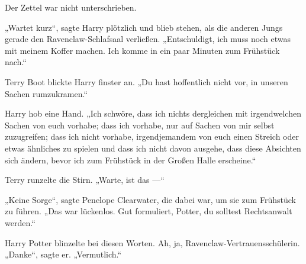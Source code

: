 \begin{writtenNote}
\end{writtenNote}

Der Zettel war nicht unterschrieben.

\later

„Wartet kurz“, sagte Harry plötzlich und blieb stehen, als die anderen Jungs gerade den Ravenclaw-Schlafsaal verließen.
„Entschuldigt, ich muss noch etwas mit meinem Koffer machen. Ich komme in ein paar Minuten zum Frühstück nach.“

Terry Boot blickte Harry finster an.
„Du hast hoffentlich nicht vor, in unseren Sachen rumzukramen.“

Harry hob eine Hand.
„Ich schwöre, dass ich nichts dergleichen mit irgendwelchen Sachen von euch vorhabe; dass ich vorhabe, nur auf Sachen von mir selbst zuzugreifen; dass ich nicht vorhabe, irgendjemandem von euch einen Streich oder etwas ähnliches zu spielen und dass ich nicht davon ausgehe, dass diese Absichten sich ändern, bevor ich zum Frühstück in der Großen Halle erscheine.“

Terry runzelte die Stirn.
„Warte, ist das —“

„Keine Sorge“, sagte Penelope Clearwater, die dabei war, um sie zum Frühstück zu führen.
„Das war lückenlos. Gut formuliert, Potter, du solltest Rechtsanwalt werden.“

Harry Potter blinzelte bei diesen Worten. Ah, ja, Ravenclaw-Vertrauensschülerin.
„Danke“, sagte er.
„Vermutlich.“

